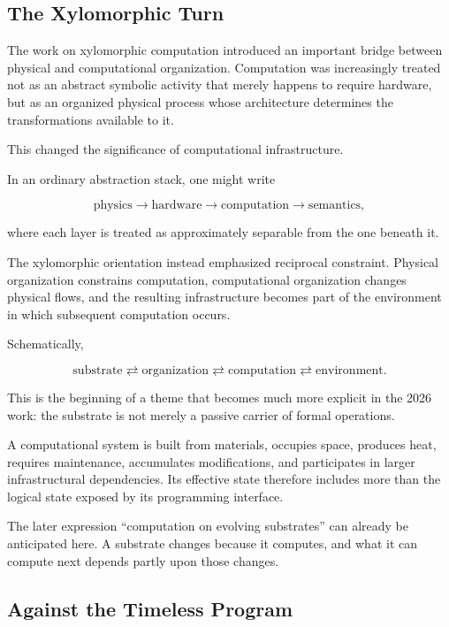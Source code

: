 \documentclass[11pt]{article}
\theoremstyle{remark}
\begin{document}
\subsection{The Xylomorphic Turn}

The work on xylomorphic computation introduced an important bridge between physical and computational organization. Computation was increasingly treated not as an abstract symbolic activity that merely happens to require hardware, but as an organized physical process whose architecture determines the transformations available to it.

This changed the significance of computational infrastructure.

In an ordinary abstraction stack, one might write

\begin{equation}
\text{physics}
\rightarrow
\text{hardware}
\rightarrow
\text{computation}
\rightarrow
\text{semantics},
\end{equation}

where each layer is treated as approximately separable from the one beneath it.

The xylomorphic orientation instead emphasized reciprocal constraint. Physical organization constrains computation, computational organization changes physical flows, and the resulting infrastructure becomes part of the environment in which subsequent computation occurs.

Schematically,

\begin{equation}
\text{substrate}
\rightleftarrows
\text{organization}
\rightleftarrows
\text{computation}
\rightleftarrows
\text{environment}.
\end{equation}

This is the beginning of a theme that becomes much more explicit in the 2026 work: the substrate is not merely a passive carrier of formal operations.

A computational system is built from materials, occupies space, produces heat, requires maintenance, accumulates modifications, and participates in larger infrastructural dependencies. Its effective state therefore includes more than the logical state exposed by its programming interface.

The later expression ``computation on evolving substrates'' can already be anticipated here. A substrate changes because it computes, and what it can compute next depends partly upon those changes.

\subsection{Against the Timeless Program}
\end{document}
